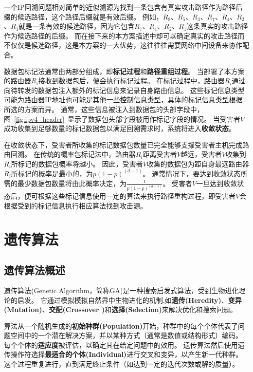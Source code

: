 一个IP回溯问题相对简单的近似溯源为找到一条包含有真实攻击路径作为路径后缀的候选路径，这个路径后缀就是有效后缀\cite{savage2000practical}。
例如，$R_8$、$R_5$、$R_3$、$R_7$、$R_4$、$R_2$、$R_1$就是一条有效的候选路径，因为它包含$R_7$、$R_4$、$R_2$、$R_1$这条真实的攻击路径作为候选路径的后缀。
而在接下来的本方案描述中却可以确定真实的攻击路径而不仅仅是候选路径，这是本方案的一大优势，这往往往需要网络中间设备来协作配合。



数据包标记法通常由两部分组成，即\textbf{标记过程}和\textbf{路径重组过程}。
当部署了本方案的路由器$R_i$接收到数据包后，便会执行标记过程。
在标记过程中，路由器$R_i$通过向待转发的数据包注入额外的标记信息来记录自身路由信息。
这些标记信息类型可能为路由器IP地址也可能是其他一些控制信息类型，具体的标记信息类型根据所选的方案而异。
通常，这些信息被注入到数据包的头部字段中，图~\ref{fig:ipv4_header}~显示了数据包头部字段被用作标记字段的情况。
当受害者$V$成功收集到足够数量的标记数据包以满足回溯需求时，系统将进入\textbf{收敛状态}。



在收敛状态下，受害者所收集的标记数据包数量已完全能够支撑受害者主机完成路由回溯。
在传统的概率包标记法中，路由器$R_i$距离受害者$V$越远，受害者$V$收集到$R_i$所标记的数据包概率将越小。
因此，受害者$V$收集的数据包为距自身最远路由器$R_i$所标记的概率是最小的，为$p(1-p)^(d-1)$。
通常情况下，要达到收敛状态所需的最少数据包数量将由此概率决定，为$\frac{1}{p(1-p)^(d-1)}$。
受害者$V$一旦达到收敛状态后，便可根据这些标记信息使用一定的算法来执行路径重构过程，即受害者$V$会根据受到的标记信息执行相应算法找到攻击源。

\section{遗传算法\cite{zhou2006matlab}}
\label{sec:GA}
\subsection{遗传算法概述}
遗传算法(Genetic Algorithm，简称GA)是一种搜索启发式算法，受到生物进化理论的启发。
它通过模拟模拟自然界中生物进化的机制,如\textbf{遗传(Heredity)}、\textbf{变异(Mutation)}、\textbf{交配(Crossover )}和\textbf{选择(Selection)}来解决优化和搜索问题。


算法从一个随机生成的\textbf{初始种群(Population)}开始，种群中的每个个体代表了问题空间中的一个潜在解决方案，并以某种方式（通常是数值或结构形式）编码。
每个个体的\textbf{适应度}被评估，以确定其在给定问题中的效用。
遗传算法然后使用遗传操作符选择\textbf{最适合的个体(Individual)}进行交叉和变异，以产生新一代种群。
这个过程重复进行，直到满足终止条件（如达到一定的迭代次数或解的质量）。


